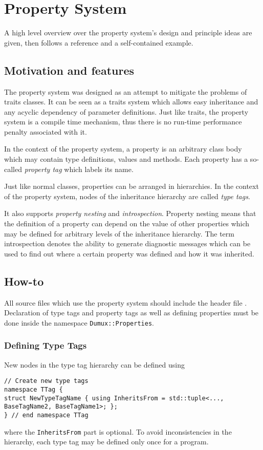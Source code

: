 \section{Property System}
\label{sec:propertysystem}
A high level overview over the property system's design and principle ideas
are given, then follows a reference and a self-contained example.

\subsection{Motivation and features}
The \Dumux property system was designed as an attempt to mitigate the
problems of traits classes. It can be seen as a traits system
which allows easy inheritance and any acyclic dependency of parameter
definitions. Just like traits, the \Dumux property system is a compile
time mechanism, thus there is no run-time performance penalty associated
with it.

In the context of the \Dumux property system, a property is an arbitrary
class body which may contain type definitions, values and methods. Each
property has a so-called \emph{property tag} which labels its name.

Just like normal classes, properties can be arranged in hierarchies. In
the context of the \Dumux property system, nodes of the inheritance
hierarchy are called \emph{type tags}.

It also supports \emph{property nesting} and
\emph{introspection}. Property nesting means that the definition of
a property can depend on the value of other properties which may be
defined for arbitrary levels of the inheritance hierarchy. The term
introspection denotes the ability to generate diagnostic messages
which can be used to find out where a certain property was defined and
how it was inherited.

\subsection{How-to}
All source files which use the property system should include
the header file .
Declaration of type tags and
property tags as well as defining properties must be done inside the
namespace \texttt{Dumux::Properties}.

\subsubsection{Defining Type Tags}
New nodes in the type tag hierarchy can be defined using
\begin{lstlisting}[style=DumuxCode]
// Create new type tags
namespace TTag {
struct NewTypeTagName { using InheritsFrom = std::tuple<..., BaseTagName2, BaseTagName1>; };
} // end namespace TTag
\end{lstlisting}
where the \texttt{InheritsFrom} part is optional. To avoid
inconsistencies in the hierarchy, each type tag may be defined only
once for a program.

